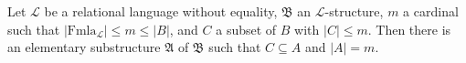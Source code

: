 Let $\mathcal{L}$ be a relational language without equality, $\mathfrak{B}$ an $\mathcal{L}$-structure, $m$ a cardinal such that $|\text{Fmla}_{\mathcal{L}}| \leq m \leq |B|$, and $C$ a subset of $B$ with $|C| \leq m$. Then there is an elementary substructure $\mathfrak{A}$ of $\mathfrak{B}$ such that $C \subseteq A$ and $|A| = m$.
